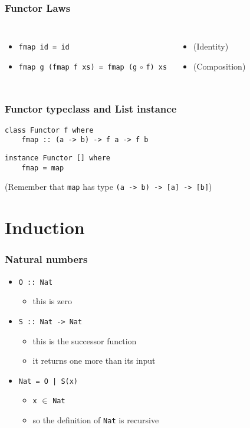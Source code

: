 \documentclass{beamer}
\begin{document}
\begin{frame}[fragile]
    \frametitle {Functor Laws}

\begin{columns}
\begin{itemize}
\item \verb?fmap id = id?
\item \verb?fmap g (fmap f xs) = fmap (g? $\circ$ \verb?f) xs?
\end{itemize}
\begin{itemize}
\item[] (Identity)
\item[] (Composition)
\end{itemize}
\end{columns}

\end{frame}

\begin{frame}[fragile]
    \frametitle {Functor typeclass and List instance}

\begin{verbatim}
class Functor f where
    fmap :: (a -> b) -> f a -> f b 
\end{verbatim}

\begin{verbatim}
instance Functor [] where
    fmap = map
\end{verbatim}

(Remember that \verb?map? has type \verb?(a -> b) -> [a] -> [b]?)

\end{frame}

\section{Induction}

\begin{frame}[fragile]
    \frametitle {Natural numbers}
\begin{itemize}
    \item \verb?O :: Nat?
    \begin{itemize}
        \item this is zero
    \end{itemize}

    \item \verb?S :: Nat -> Nat?
    \begin{itemize}
        \item this is the successor function
        \item it returns one more than its input
    \end{itemize}

    \item \verb?Nat = O | S(x)?
    \begin{itemize}
        \item \verb?x? $\in$ \verb?Nat?
        \item so the definition of \verb?Nat? is recursive
    \end{itemize}

    \end{itemize}
\end{frame}
\end{document}
